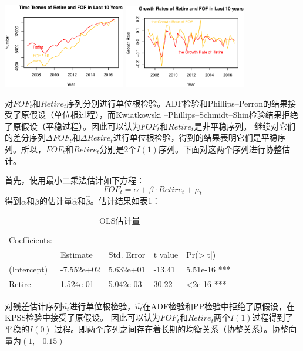\documentclass[10pt]{article}
\begin{document}
\includegraphics[width=0.4\textwidth]{3-0-1.eps}
\includegraphics[width=0.4\textwidth]{3-0-2.eps}

对${FOF_t}$和${Retire_t}$序列分别进行单位根检验。ADF检验和Phillips–Perron的结果接受了原假设（单位根过程），而Kwiatkowski –Phillips–Schmidt–Shin检验结果拒绝了原假设（平稳过程）。因此可以认为${FOF_t}$和${Retire_t}$是非平稳序列。
继续对它们的差分序列${\Delta FOF_t}$和${\Delta Retire_t}$进行单位根检验，得到的结果表明它们是平稳序列。所以，${FOF_t}$和${Retire_t}$分别是2个$I(1)$序列。下面对这两个序列进行协整估计。

首先，使用最小二乘法估计如下方程：
$$FOF_t = \alpha + \beta \cdot Retire_t + \mu_t$$
得到$\alpha$和$\beta$的估计量$\hat{\alpha}$和$\hat{\beta}$。估计结果如表1：

\begin{table}[]
    \centering
    \caption{OLS估计量}
    \label{my-label}
    \begin{tabular}{l | llll}
        Coefficients: &            &            &         &                     \\
                      & Estimate   & Std. Error & t value & Pr(\textgreater|t|) \\  \hline
        (Intercept)   & -7.552e+02 & 5.632e+01  & -13.41  & 5.51e-16 ***        \\
        Retire        & 1.524e-01  & 5.042e-03  & 30.22   & \textless 2e-16 ***
    \end{tabular}
\end{table}


对残差估计序列${\hat{u_t}}$进行单位根检验，${\hat{u_t}}$在ADF检验和PP检验中拒绝了原假设，在KPSS检验中接受了原假设。
因此可以认为${FOF_t}$和${Retire_t}$两个$I(1)$过程得到了平稳的$I(0)$
过程。即两个序列之间存在着长期的均衡关系（协整关系）。协整向量为$(1, -0.15)$
\end{document}
